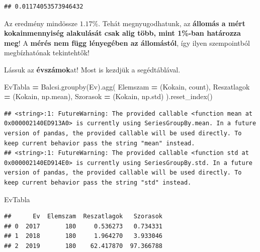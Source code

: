\documentclass[
]{book}
\newenvironment{Shaded}{\begin{snugshade}}{\end{snugshade}}
\newcommand{\NormalTok}[1]{#1}
\newcommand{\OperatorTok}[1]{\textcolor[rgb]{0.81,0.36,0.00}{\textbf{#1}}}
\newcommand{\StringTok}[1]{\textcolor[rgb]{0.31,0.60,0.02}{#1}}
\begin{document}
\begin{verbatim}
## 0.01174053573946432
\end{verbatim}

Az eredmény mindössze \(1.17\%\). Tehát megnyugodhatunk, az \textbf{állomás a mért kokainmennyiség alakulását csak alig több, mint 1\%-ban határozza meg}! A \textbf{mérés nem függ lényegében az állomástól}, így ilyen szempointból megbízhatónak tekintehtők!

Lássuk az \textbf{évszámok}at! Most is kezdjük a segédtáblával.

\begin{Shaded}
\begin{Highlighting}[]
\NormalTok{EvTabla }\OperatorTok{=}\NormalTok{ Balcsi.groupby(}\StringTok{\textquotesingle{}Ev\textquotesingle{}}\NormalTok{).agg(}
\NormalTok{  Elemszam }\OperatorTok{=}\NormalTok{ (}\StringTok{\textquotesingle{}Kokain\textquotesingle{}}\NormalTok{, }\StringTok{\textquotesingle{}count\textquotesingle{}}\NormalTok{),}
\NormalTok{  Reszatlagok }\OperatorTok{=}\NormalTok{ (}\StringTok{\textquotesingle{}Kokain\textquotesingle{}}\NormalTok{, np.mean),}
\NormalTok{  Szorasok }\OperatorTok{=}\NormalTok{ (}\StringTok{\textquotesingle{}Kokain\textquotesingle{}}\NormalTok{, np.std)}
\NormalTok{).reset\_index()}
\end{Highlighting}
\end{Shaded}

\begin{verbatim}
## <string>:1: FutureWarning: The provided callable <function mean at 0x000002140ED913A0> is currently using SeriesGroupBy.mean. In a future version of pandas, the provided callable will be used directly. To keep current behavior pass the string "mean" instead.
## <string>:1: FutureWarning: The provided callable <function std at 0x000002140ED914E0> is currently using SeriesGroupBy.std. In a future version of pandas, the provided callable will be used directly. To keep current behavior pass the string "std" instead.
\end{verbatim}

\begin{Shaded}
\begin{Highlighting}[]
\NormalTok{EvTabla}
\end{Highlighting}
\end{Shaded}

\begin{verbatim}
##      Ev  Elemszam  Reszatlagok   Szorasok
## 0  2017       180     0.536273   0.734331
## 1  2018       180     1.964270   3.933046
## 2  2019       180    62.417870  97.366788
\end{verbatim}
\end{document}
